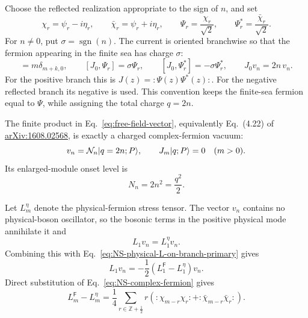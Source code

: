 \documentclass[11pt]{article}
\newcommand{\Ff}{\mathsf F}
\begin{document}
Choose the reflected realization appropriate to the sign of \(n\), and set
\begin{equation}
 \chi_r=\psi_r-i\eta_r,
 \qquad
 \bar\chi_r=\psi_r+i\eta_r,
 \qquad
 \Psi_r=\frac{\chi_r}{\sqrt2},
 \qquad
 \Psi_r^*=\frac{\bar\chi_r}{\sqrt2}.
 \label{eq:NS-complex-fermion}
\end{equation}
For \(n\ne0\), put \(\sigma=\operatorname{sgn}(n)\).  The current is
oriented branchwise so that the fermion appearing in the finite sea has
charge \(\sigma\):
\begin{equation}
 [J_m,J_k]=m\delta_{m+k,0},
 \qquad
 [J_0,\Psi_r]=\sigma\Psi_r,
 \qquad
 [J_0,\Psi_r^*]=-\sigma\Psi_r^*,
 \qquad
 J_0v_n=2n\,v_n.
 \label{eq:NS-current-charge}
\end{equation}
For the positive branch this is
\(J(z)=:\!\Psi(z)\Psi^*(z)\!:\).  For the negative reflected branch its
negative is used.  This convention keeps the finite-sea fermion equal to
\(\Psi\), while assigning the total charge \(q=2n\).

The finite product in Eq.~\eqref{eq:free-field-vector}, equivalently
Eq.~(4.22) of
\href{https://arxiv.org/abs/1608.02568}{arXiv:1608.02568}, is exactly a
charged complex-fermion vacuum:
\begin{equation}
 v_n={\cal N}_n|q=2n;P\rangle,
 \qquad
 J_m|q;P\rangle=0\quad(m>0).
 \label{eq:NS-v-as-charged-vacuum}
\end{equation}
Its enlarged-module onset level is
\begin{equation}
 N_n=2n^2=\frac{q^2}{2}.
 \label{eq:NS-branch-onset}
\end{equation}

Let \(L_m^\eta\) denote the physical-fermion stress tensor.  The vector
\(v_n\) contains no physical-boson oscillator, so the bosonic terms in the
positive physical mode annihilate it and
\begin{equation}
 L_1v_n=L_1^\eta v_n.
\end{equation}
Combining this with Eq.~\eqref{eq:NS-physical-L-on-branch-primary} gives
\begin{equation}
 L_1v_n=-\frac12(L_1^{\Ff}-L_1^\eta)v_n.
 \label{eq:NS-L1-stress-difference}
\end{equation}
Direct substitution of Eq.~\eqref{eq:NS-complex-fermion} gives
\begin{equation}
 L_m^{\Ff}-L_m^\eta
 =\frac14\sum_{r\in\mathbb Z+\frac12}r\left(
 :\!\chi_{m-r}\chi_r\!:
 +:\!\bar\chi_{m-r}\bar\chi_r\!:
 \right).
 \label{eq:NS-stress-difference-pairs}
\end{equation}
\end{document}
